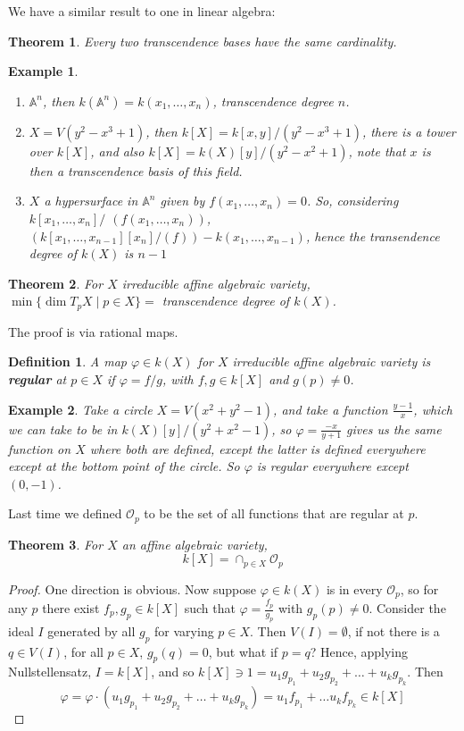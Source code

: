 \documentclass[12pt]{article}
\newcommand{\A}{\mathbb{A}}
\renewcommand{\O}{\mathcal{O}}
\renewcommand{\phi}{\varphi}
\newtheorem{definition}{Definition}[section]
\newtheorem*{example}{Example}
\newtheorem{theorem}{Theorem}[section]
\begin{document}
    We have a similar result to one in linear algebra:
    \begin{theorem}
        Every two transcendence bases have the same cardinality.
    \end{theorem}
    \begin{example}
        \begin{enumerate}
            \item $\A^n$, then $k(\A^n) = k(x_1, \dots, x_n)$, transcendence degree $n$.
            \item $X = V(y^2 - x^3 + 1)$, then $k[X] = k[x, y]/(y^2 - x^3 + 1)$, there is a tower over $k[X]$, and also $k[X] = k(X)[y]/(y^2 - x^2 + 1)$, note that $x$ is then a transcendence basis of this field.
            \item $X$ a hypersurface in $\A^n$ given by $f(x_1, \dots, x_n) = 0$. So, considering $k[x_1, \dots, x_n]/$ $(f(x_1, \dots, x_n))$, $(k[x_1, \dots, x_{n-1}][x_n]/(f)) - k(x_1, \dots, x_{n-1})$, hence the transendence degree of $k(X)$ is $n-1$
        \end{enumerate}
    \end{example}
    \begin{theorem} \label{thm:dim_equiv}
        For $X$ irreducible affine algebraic variety, $\min \{\dim T_pX \mid p \in X\} = $ transcendence degree of $k(X)$.
    \end{theorem}
    The proof is via rational maps.
    \begin{definition}
        A map $\phi \in k(X)$ for $X$ irreducible affine algebraic variety is \textbf{regular} at $p \in X$ if $\phi = f/g$, with $f, g \in k[X]$ and $g(p) \neq 0$.
    \end{definition}
    \begin{example}
        Take a circle $X = V(x^2 + y^2 - 1)$, and take a function $\frac{y-1}{x}$, which we can take to be in $k(X)[y]/(y^2 + x^2 - 1)$, so $\phi = \frac{-x}{y+1}$ gives us the same function on $X$ where both are defined, except the latter is defined everywhere except at the bottom point of the circle. So $\phi$ is regular everywhere except $(0, -1)$.
    \end{example}
    Last time we defined $\O_p$ to be the set of all functions that are regular at $p$.
    \begin{theorem}
        For $X$ an affine algebraic variety,
        $$k[X] = \cap_{p \in X} \O_p$$
    \end{theorem}
    \begin{proof}
        One direction is obvious. Now suppose $\phi \in k(X)$ is in every $\O_p$, so for any $p$ there exist $f_p, g_p \in k[X]$ such that $\phi = \frac{f_p}{g_p}$ with $g_p(p) \neq 0$. Consider the ideal $I$ generated by all $g_p$ for varying $p \in X$. Then $V(I) = \emptyset$, if not there is a $q \in V(I)$, for all $p \in X$, $g_p(q) = 0$, but what if $p = q$? Hence, applying Nullstellensatz, $I = k[X]$, and so $k[X] \ni 1 = u_1g_{p_1} + u_2g_{p_2} + \dots + u_kg_{p_k}$. Then
        $$\phi = \phi \cdot (u_1g_{p_1} + u_2g_{p_2} + \dots + u_kg_{p_k}) = u_1f_{p_1} + \dots u_kf_{p_k} \in k[X]$$
    \end{proof}
\end{document}
